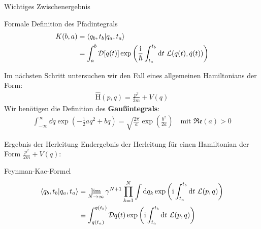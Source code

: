 \begin{frame}{Wichtiges Zwischenergebnis}
\begin{block}{Formale Definition des Pfadintegrals}
\begin{align*}
	K(b,a) &= \braket{q_b,t_b}{q_a,t_a}\\
	&= \int_a^b \mathcal{D}[q(t)] \exp\left(\frac{\mathrm{i}}{\hbar}\int_{t_a}^{t_b}\dd t \ \mathcal{L}(q(t),\dot{q}(t))\right)
\end{align*}
\end{block}
Im nächsten Schritt untersuchen wir den Fall eines allgemeinen Hamiltonians der Form:
\begin{align*}
	\hat{\text{H}}(p,q) = \frac{p^2}{2m} + V(q) 
\end{align*}
Wir benötigen die Definition des \textbf{Gaußintegrals}: 
\begin{align*}
	\int_{-\infty}^{\infty}\dd q \exp\left(-\frac{1}{2}a q^2 + b q\right) = \sqrt{\frac{2\pi}{a}}\exp\left(\frac{b^2}{2a}\right) \quad \text{mit } \mathfrak{Re}(a)>0 
\end{align*}
\end{frame}


\begin{frame}{Ergebnis der Herleitung}
Endergebnis der Herleitung für einen Hamiltonian der Form $\frac{p^2}{2m} + V(q)$:
\begin{block}{Feynman-Kac-Formel}
\begin{align*}
	 \braket{q_b,t_b}{q_a,t_a} &= \lim_{N \rightarrow\infty} \gamma^{N+1}\prod_{k=1}^{N} \int\dd q_k \exp\left(\mathrm{i}\int_{t_a}^{t_b}\dd t \ \mathcal{L}(p,q)\right) \\
	 &\equiv \int_{q(t_a)}^{q(t_b)} \mathcal{D}q(t) \exp\left(\mathrm{i}\int_{t_a}^{t_b}\dd t \ \mathcal{L}(p,q)\right)
\end{align*}	
\end{block}
	
\end{frame}